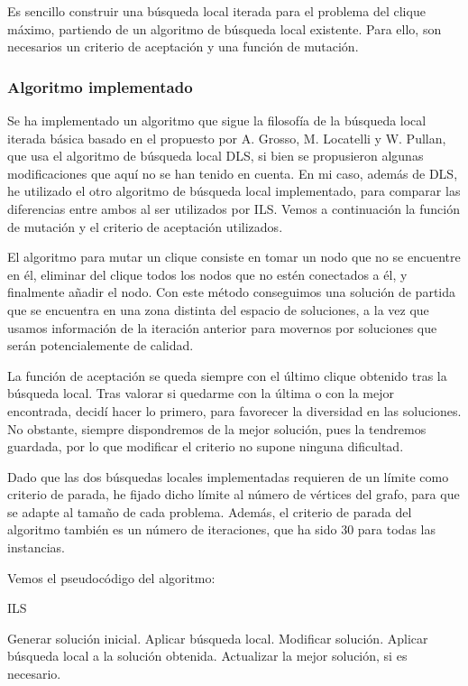 Es sencillo construir una búsqueda local iterada para el problema del clique máximo, partiendo de un
algoritmo de búsqueda local existente. Para ello, son necesarios un criterio de aceptación y una
función de mutación.

\subsubsection{Algoritmo implementado}

Se ha implementado un algoritmo que sigue la filosofía de la búsqueda local iterada básica basado en
el propuesto por A. Grosso, M. Locatelli y W. Pullan, que usa el algoritmo de búsqueda local
DLS, si bien se propusieron algunas modificaciones que aquí no se han tenido en cuenta.
En mi caso, además de DLS, he utilizado el otro algoritmo de búsqueda local implementado,
para comparar las diferencias entre ambos al ser utilizados por ILS.
Vemos a continuación la función de mutación y el criterio de aceptación utilizados.

El algoritmo para mutar un clique consiste en tomar un nodo que no se encuentre en él, eliminar del clique
todos los nodos que no estén conectados a él, y finalmente añadir el nodo. Con este método conseguimos
una solución de partida que se encuentra en una zona distinta del espacio de soluciones, a la vez que
usamos información de la iteración anterior para movernos por soluciones que serán potencialemente de calidad.

La función de aceptación se queda siempre con el último clique obtenido tras la búsqueda local. Tras valorar
si quedarme con la última o con la mejor encontrada, decidí hacer lo primero, para favorecer la diversidad en
las soluciones. No obstante, siempre dispondremos de la mejor solución, pues la tendremos guardada, por lo
que modificar el criterio no supone ninguna dificultad.

Dado que las dos búsquedas locales implementadas requieren de un límite como criterio de parada, he fijado dicho
límite al número de vértices del grafo, para que se adapte al tamaño de cada problema. Además, el criterio de
parada del algoritmo también es un número de iteraciones, que ha sido $30$ para todas las instancias.

Vemos el pseudocódigo del algoritmo:

\begin{algorithm}[H]
\caption{ILS}
  \begin{algorithmic}
    \State Generar solución inicial.
    \State Aplicar búsqueda local.
  \Repeat
    \State Modificar solución.
    \State Aplicar búsqueda local a la solución obtenida.
    \State Actualizar la mejor solución, si es necesario.
  \end{algorithmic}
\end{algorithm}

